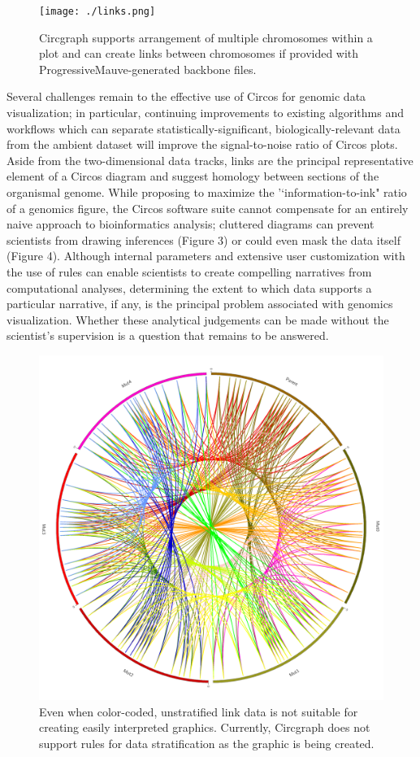 \documentclass[twocolumn]{article}
\begin{document}
\begin{figure}
\centering
\texttt{[image: ./links.png]}
\caption{Circgraph supports arrangement of multiple chromosomes within a plot and can create links between chromosomes if provided with ProgressiveMauve-generated backbone files.}
\end{figure}

Several challenges remain to the effective use of Circos for genomic data visualization; in particular, continuing improvements to existing algorithms and workflows which can separate statistically-significant, biologically-relevant data from the ambient dataset will improve the signal-to-noise ratio of Circos plots. Aside from the two-dimensional data tracks, links are the principal representative element of a Circos diagram and suggest homology between sections of the organismal genome. While proposing to maximize the '`information-to-ink" ratio of a genomics figure, the Circos software suite cannot compensate for an entirely naive approach to bioinformatics analysis; cluttered diagrams can prevent scientists from drawing inferences (Figure 3) or could even mask the data itself (Figure 4).\cite{circospaper} Although internal parameters and extensive user customization with the use of rules can enable scientists to create compelling narratives from computational analyses, determining the extent to which data supports a particular narrative, if any, is the principal problem associated with genomics visualization. Whether these analytical judgements can be made without the scientist's supervision is a question that remains to be answered.

\begin{figure}
\centering
\includegraphics[scale=0.075]{./Generated_Data_Non_Ribbon.png}
\caption{Even when color-coded, unstratified link data is not suitable for creating easily interpreted graphics. Currently, Circgraph does not support rules for data stratification as the graphic is being created.}
\end{figure}
\end{document}
